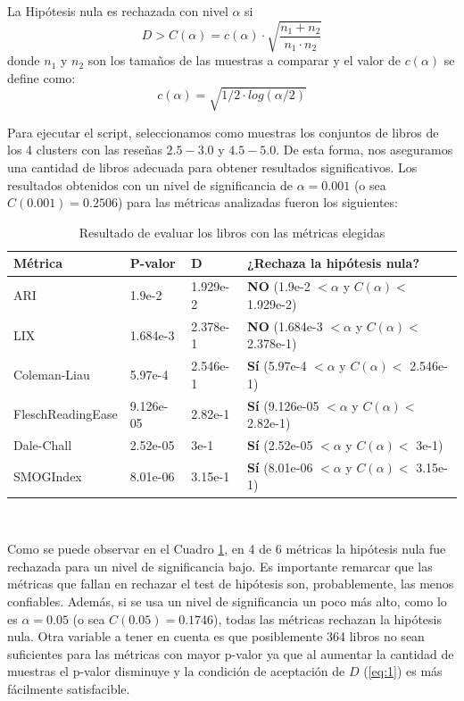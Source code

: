 \documentclass[12pt,journal,compsoc]{IEEEtran}
\begin{document}
La Hipótesis nula es rechazada con nivel $\alpha$ si
\begin{equation} \label{eq:1}
D > C(\alpha) = c(\alpha) \cdot \sqrt{\frac{n_1+n_2}{n_1\cdot n_2}}
\end{equation}
donde $n_1$ y $n_2$ son los tamaños de las muestras a comparar y el valor de $c(\alpha)$ se define como:
$$c(\alpha) = \sqrt{1/2\cdot log(\alpha/2)}$$

Para ejecutar el script, seleccionamos como muestras los conjuntos de libros de los 4 clusters con las reseñas $2.5-3.0$ y $4.5-5.0$. De esta forma, nos aseguramos una cantidad de libros adecuada para obtener resultados significativos. Los resultados obtenidos con un nivel de significancia de $\alpha = 0.001$ (o sea $C(0.001) = 0.2506$) para las métricas analizadas fueron los siguientes:\\

\begin{table}[H]
\begin{center}
  \begin{tabular}{ | l | l | l | l | }
  \hline
  Métrica & P-valor & D & ¿Rechaza la hipótesis nula?\\
  \hline
  ARI & 1.9e-2 & 1.929e-2 & \textbf{NO} (1.9e-2 $< \alpha$ y $C(\alpha) <$ 1.929e-2)\\
  \hline
  LIX & 1.684e-3 & 2.378e-1 & \textbf{NO} (1.684e-3 $< \alpha$ y $C(\alpha) <$ 2.378e-1)\\
  \hline
  Coleman-Liau & 5.97e-4 & 2.546e-1 & \textbf{Sí} (5.97e-4 $< \alpha$ y $C(\alpha) <$ 2.546e-1)\\
  \hline
  FleschReadingEase & 9.126e-05 & 2.82e-1 & \textbf{Sí} (9.126e-05 $< \alpha$ y $C(\alpha) <$ 2.82e-1)\\
  \hline
  Dale-Chall & 2.52e-05 & 3e-1 & \textbf{Sí} (2.52e-05 $< \alpha$ y $C(\alpha) <$ 3e-1)\\
  \hline
  SMOGIndex & 8.01e-06 & 3.15e-1 & \textbf{Sí} (8.01e-06 $< \alpha$ y $C(\alpha) <$ 3.15e-1)\\
  \hline
  \end{tabular}
  \caption{\small Resultado de evaluar los libros con las métricas elegidas}
  \label{table:resultadoMetricas}
  \end{center}
  \end{table}


~

Como se puede observar en el Cuadro \ref{table:resultadoMetricas}, en 4 de 6 métricas la hipótesis nula fue rechazada para un nivel de significancia bajo. Es importante remarcar que las métricas que fallan en rechazar el test de hipótesis son, probablemente, las menos confiables. Además, si se usa un nivel de significancia un poco más alto, como lo es $\alpha = 0.05$ (o sea $C(0.05) = 0.1746$), todas las métricas rechazan la hipótesis nula. Otra variable a tener en cuenta es que posiblemente 364 libros no sean suficientes para las métricas con mayor p-valor ya que al aumentar la cantidad de muestras el p-valor disminuye y la condición de aceptación de $D$ (\ref{eq:1}) es más fácilmente satisfacible.
\end{document}
